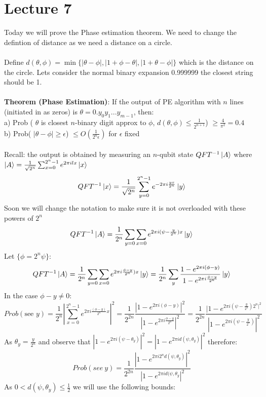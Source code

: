 \documentclass{article}
\begin{document}
{\section{Lecture 7}
Today we will prove the Phase estimation theorem. We need to change the defintion of distance as we need a distance on a circle.\\\\
Define $d(\theta, \phi) = \min \{ |\theta -\phi|, |1 + \phi - \theta|, |1+ \theta - \phi|\}$ which is the distance on the circle. Lets consider the normal binary expansion 0.999999 the closest string should be 1.\\\\
\textbf{Theorem (Phase Estimation)}: If the output of PE algorithm with $n$ lines (initiated in as zeros) is $\theta = 0.y_0y_1...y_{m-1}$, then:\\
a) Prob ( $\theta$ is closest $n$-binary digit approx to $\phi$, $d(\theta, \phi) \leq \frac{1}{2^{n+1}}$) $\geq \frac{4}{\pi^2} = 0.4$\\
b) Prob( $|\theta - \phi| \geq \epsilon$) $\leq O(\frac{1}{2^n \epsilon})$ for $\epsilon$ fixed\\\\
Recall: the output is obtained by measuring an $n$-qubit state $QFT^{-1} \ket{A}$ where $\ket{A} = \frac{1}{\sqrt{2^n}} \sum_{x = 0}^{2^n-1} e^{2\pi i l x} \ket{x}$
$$
QFT^{-1} \ket{x} = \frac{1}{\sqrt{2^n}} \sum_{y= 0}^{2^n-1} e^{-2\pi i \frac{y x}{2^n}} \ket{y}
$$
Soon we will change the notation to make sure it is not overloaded with these powers of $2^n$
$$
QFT^{-1} \ket{A} = \frac{1}{2^n}\sum_{y=0} \sum_{x=0} e^{2 \pi i ( \psi - \frac{y}{2^n})x} \ket{y}
$$
Let $\{ \phi = 2^n \psi \}$:
$$
QFT^{-1} \ket{A} = \frac{1}{2^n}\sum_{y=0} \sum_{x=0} e^{2 \pi i  \frac{\phi - y}{2^n})x} \ket{y} = \frac{1}{2^n}  \sum_y \frac{ 1 - e^{2\pi i (\phi - y)}}{ 1 - e^{2\pi i \frac{\phi - y}{2^n}}} \ket{y}
$$
In the case $\phi - y \neq 0$:
$$
Prob( \text{see } y) =  \frac{1}{2^n} |\sum_{x=0}^{2^n-1} e^{2\pi i\frac{(\phi - y)}{2^n} x}|^2 = \frac{1}{2^{2n}} \frac{ |1 - e^{2\pi i (\phi - y)}|^2}{ | 1 - e^{2\pi i \frac{\phi - y}{2^n}}|^2} = \frac{1}{2^{2n}} \frac{| 1 - e^{2\pi i (\psi - \frac{y}{2^n}) 2^n|^2}}{| 1 - e^{2\pi i (\psi - \frac{y}{2^n})}|^2}
$$
As $\theta_y = \frac{y}{2^n}$ and observe that $|1- e^{2\pi i(\psi - \theta_y)}|^2 = |1 - e^{2\pi i d(\psi, \theta_y)}|^2$ therefore:
        $$
Prob( see\> y) =  \frac{1}{2^{2n}} \frac{|1 - e^{2\pi i 2^n d(\psi, \theta_y)}|^2}{|1 - e^{2 \pi i d(\psi, \theta_y}|^2}
        $$
As $0<d(\psi, \theta_y)\leq \frac{1}{2}$ we will use the following bounds:\\
}
\end{document}
